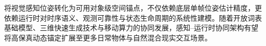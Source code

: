 \documentclass[review]{vgtc}
\begin{document}
将视觉感知位姿转化为可用对象级空间锚点，不仅依赖底层单帧位姿估计精度，更依赖运行时对时序语义、观测可靠性与状态生命周期的系统性建模。随着开放词表基础模型、三维快速生成技术与移动算力的协同发展，感知--运行时协同架构有望将高保真动态锚定扩展至更多日常物体与自然混合现实交互场景。




\end{document}
